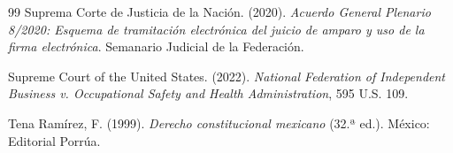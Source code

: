\documentclass[12pt,spanish,letterpaper,oneside]{article}
\begin{document}
\begin{thebibliography}{99}
Suprema Corte de Justicia de la Naci\'on. (2020). \emph{Acuerdo General Plenario 8/2020: Esquema de tramitaci\'on electr\'onica del juicio de amparo y uso de la firma electr\'onica}. Semanario Judicial de la Federaci\'on.

Supreme Court of the United States. (2022). \emph{National Federation of Independent Business v. Occupational Safety and Health Administration}, 595 U.S. 109.

Tena Ram\'irez, F. (1999). \emph{Derecho constitucional mexicano} (32.ª ed.). M\'exico: Editorial Porr\'ua.

\end{thebibliography}
\end{document}

